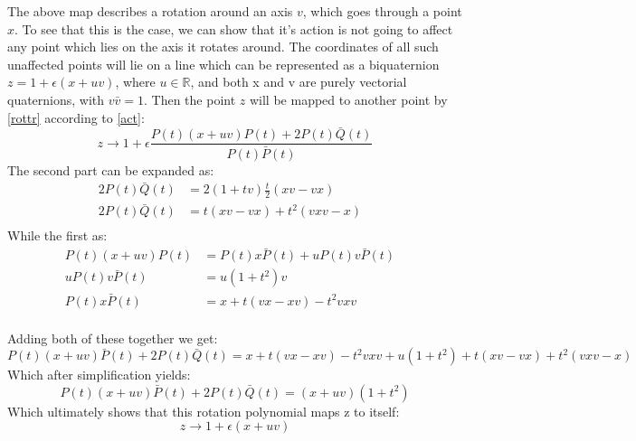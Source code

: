 The above map describes a rotation around an axis $v$, which goes through a point $x$. To see that this is the case, we can show that it's action is not going to affect any point which lies on the axis it rotates around. The coordinates of all such unaffected points will lie on a line which can be represented as a biquaternion $z = 1 + \epsilon(x + u v)$, where  $u\in \mathbb{R}$, and both x and v are purely vectorial quaternions, with $v\bar{v} = 1$. Then the point $z$ will be mapped to another point by \ref{rottr} according to \ref{act}:
\begin{equation}
    z \rightarrow 1 +\epsilon \frac{P(t)(x+uv)P(t) + 2P(t)\bar{Q}(t)}{P(t)\bar{P}(t)}
\end{equation}
The second part can be expanded as:
\begin{equation}
    \begin{aligned}
        2P(t)\bar{Q}(t)&=2(1+tv)\frac{t}{2}(xv-vx)&\mbox{}\\[1.25ex]
        2P(t)\bar{Q}(t)&=t(xv-vx)+t^{2}(vxv - x)&\mbox{}\\[1.25ex]
    \end{aligned}
\end{equation}
While the first as:
\begin{equation}
    \begin{aligned}
        P(t)(x+uv)P(t)&=P(t)x\bar{P}(t) + u P(t)v\bar{P}(t)&\mbox{}\\[1.25ex]
        uP(t)v\bar{P}(t)&= u(1+t^{2})v&\mbox{}\\[1.25ex]
        P(t)x\bar{P}(t)&= x + t(vx-xv)-t^{2}vxv&\mbox{}\\[1.25ex]
    \end{aligned}
\end{equation}

Adding both of these together we get:
\begin{equation}
    P(t)(x+uv)\bar{P}(t) + 2P(t)\bar{Q}(t) = x + t(vx-xv) - t^{2}vxv+u(1+t^{2}) + t(xv-vx) + t^{2}(vxv-x)
\end{equation}
Which after simplification yields:
\begin{equation}
    P(t)(x+uv)\bar{P}(t) + 2P(t)\bar{Q}(t) = (x + uv)(1+t^{2})
\end{equation}
Which ultimately shows that this rotation polynomial maps z to itself:
\begin{equation}
    z \rightarrow 1+\epsilon(x+uv)
\end{equation}

